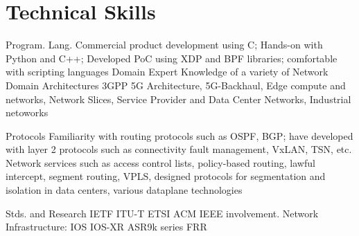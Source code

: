 \pagebreak
\section{Technical Skills}
\begin{entrylist}
\entry
{Program. Lang.} 
{Commercial product development using C;}
{}
{Hands-on with Python and C++; Developed PoC using XDP and BPF libraries; comfortable with scripting languages}
\entry
{Domain Expert}
{Knowledge of a variety of Network Domain Architectures} 
{}
{3GPP 5G Architecture, 5G-Backhaul, Edge compute and networks, Network Slices, Service Provider and Data Center Networks, Industrial netoworks}

\entry
{Protocols}
{Familiarity with routing protocols such as OSPF, BGP;  have developed with layer 2 protocols such as connectivity fault management, VxLAN, TSN, etc.}{}{ Network services such as access control lists, policy-based routing, lawful intercept, segment routing, VPLS, designed protocols for segmentation and isolation in data centers, various dataplane technologies}

\entry
{Stds. and Research} 
{ IETF \cpshalf  ITU-T \cpshalf  ETSI \cpshalf  ACM \cpshalf  IEEE involvement.}
{}
{Network Infrastructure: IOS \cpshalf IOS-XR \cpshalf ASR9k  series \cpshalf  FRR}
\end{entrylist}
\vspace{-1cm}
